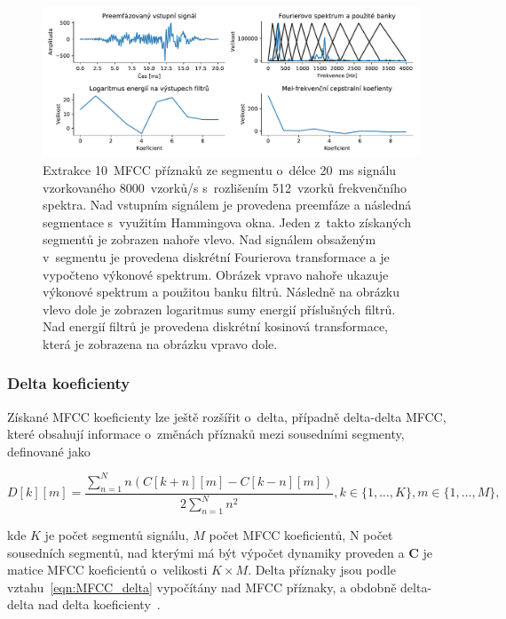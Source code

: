 \begin{figure}[ht]
  \centering
  \includegraphics[width=\linewidth, height=\textheight / 3]{obrazky-figures/mfcc.pdf}
  \caption{Extrakce 10~MFCC příznaků ze segmentu o~délce 20~ms signálu vzorkovaného 8000~{vzorků}/{s} s~rozlišením 512~vzorků frekvenčního spektra. Nad vstupním signálem je provedena preemfáze a následná segmentace s~využitím Hammingova okna. Jeden z~takto získaných segmentů je zobrazen nahoře vlevo. Nad signálem obsaženým v~segmentu je provedena diskrétní Fourierova transformace a je vypočteno výkonové spektrum. Obrázek vpravo nahoře ukazuje výkonové spektrum a použitou banku filtrů. Následně na obrázku vlevo dole je zobrazen logaritmus sumy energií příslušných filtrů. Nad energií filtrů je provedena diskrétní kosinová transformace, která je zobrazena na obrázku vpravo dole.}
  \label{fig:MFCC_process}
\end{figure}

\subsubsection{Delta koeficienty}
Získané MFCC koeficienty lze ještě rozšířit o~delta, případně delta-delta MFCC, které obsahují informace o~změnách příznaků mezi sousedními segmenty, definované jako

\begin{equation}
    \label{eqn:MFCC_delta}
    D[k][m] = \frac{\sum_{n=1}^{N} n(C[k+n][m] - C[k-n][m])}{2 \sum_{n=1}^{N} n^2}, k \in \{1,\dots,K\},  m \in \{1,\dots,M\},
\end{equation}

kde $K$ je počet segmentů signálu, $M$ počet MFCC koeficientů, N počet sousedních segmentů, nad kterými má být výpočet dynamiky proveden a \textbf{C} je matice MFCC koeficientů o~velikosti $K \times M$. Delta příznaky jsou podle vztahu~\ref{eqn:MFCC_delta} vypočítány nad MFCC příznaky, a obdobně delta-delta nad delta koeficienty~\cite{lyons_mfcc}.


